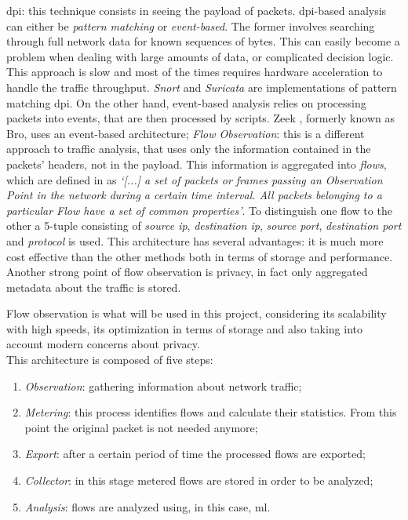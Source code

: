 \begin{itemize}
    \itemAR \gls{dpi}: this technique consists in seeing the payload of  packets. \gls{dpi}-based analysis can either be \textit{pattern matching} or \textit{event-based}. The former involves searching through full network data for known sequences of bytes. This can easily become a problem when dealing with large amounts of data, or complicated decision logic. This approach is slow and most of the times requires  hardware acceleration to handle the traffic throughput. \textit{Snort} \cite{SnortWebsite} and \textit{Suricata} \cite{SuricataWebsite} are implementations of pattern matching \gls{dpi}. On the other hand, event-based analysis relies on processing packets into events, that are then processed by scripts. Zeek \cite{ZeekWebsite}, formerly known as Bro, uses an event-based architecture;
    \itemAR \textit{Flow Observation}: this is a different approach to traffic analysis, that uses only the information contained in the packets' headers, not in the payload. This information is aggregated into \textit{flows}, which are defined in \cite{RFC7011} as \textit{`[...] a set of packets or frames passing an Observation Point in the network during a certain time interval. All packets belonging to a particular Flow have a set of common properties'}. To distinguish one flow to the other a 5-tuple consisting of \textit{source ip}, \textit{destination ip}, \textit{source port}, \textit{destination port} and \textit{protocol} is used. This architecture has several advantages: it is much more cost effective than the other methods both in terms of storage and performance. Another strong point of flow observation is privacy, in fact only aggregated metadata about the traffic is stored.
\end{itemize}

\noindent Flow observation is what will be used in this project, considering its scalability with high speeds, its optimization in terms of storage and also taking into account modern concerns about privacy. \\ This architecture is composed of five steps:

\begin{enumerate}
    \item \textit{Observation}: gathering information about network traffic;
    \item \textit{Metering}: this process identifies flows and calculate their statistics. From this point the original packet is not needed anymore;
    \item \textit{Export}: after a certain period of time the processed flows are exported;
    \item \textit{Collector}: in this stage metered flows are stored in order to be analyzed;
    \item \textit{Analysis}: flows are analyzed using, in this case, \gls{ml}.
\end{enumerate}

